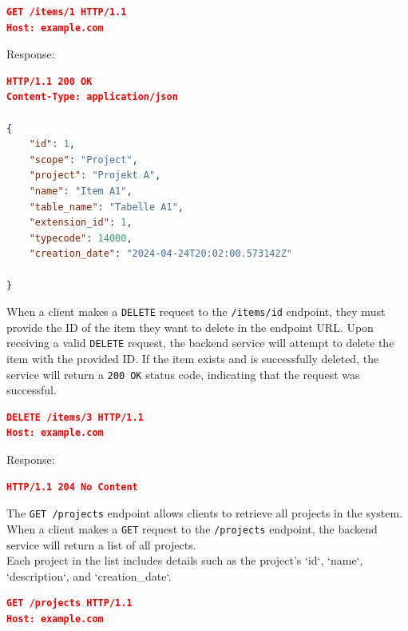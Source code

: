 \begin{lstlisting}[language=json,label={lst:lstlisting9}]
GET /items/1 HTTP/1.1
Host: example.com
\end{lstlisting}

Response:

\begin{lstlisting}[language=json,label={lst:lstlisting10}]
HTTP/1.1 200 OK
Content-Type: application/json

{
    "id": 1,
    "scope": "Project",
    "project": "Projekt A",
    "name": "Item A1",
    "table_name": "Tabelle A1",
    "extension_id": 1,
    "typecode": 14000,
    "creation_date": "2024-04-24T20:02:00.573142Z"

}
\end{lstlisting}


When a client makes a \texttt{DELETE} request to the \texttt{/items/{id}} endpoint, they must provide the ID of the item they want to delete in the endpoint URL.
Upon receiving a valid \texttt{DELETE} request, the backend service will attempt to delete the item with the provided ID.
If the item exists and is successfully deleted, the service will return a \texttt{200 OK} status code, indicating that the request was successful.

\begin{lstlisting}[language=json,label={lst:lstlisting7}]
DELETE /items/3 HTTP/1.1
Host: example.com
\end{lstlisting}

Response:

\begin{lstlisting}[language=json,label={lst:lstlisting8}]
HTTP/1.1 204 No Content
\end{lstlisting}


The \texttt{GET /projects} endpoint allows clients to retrieve all projects in the system.
When a client makes a \texttt{GET} request to the \texttt{/projects} endpoint, the backend service will return a list of all projects.
\\Each project in the list includes details such as the project's `id`, `name`, `description`, and `creation\_date`.

\begin{lstlisting}[language=json,label={lst:lstlisting11}]
GET /projects HTTP/1.1
Host: example.com
\end{lstlisting}

